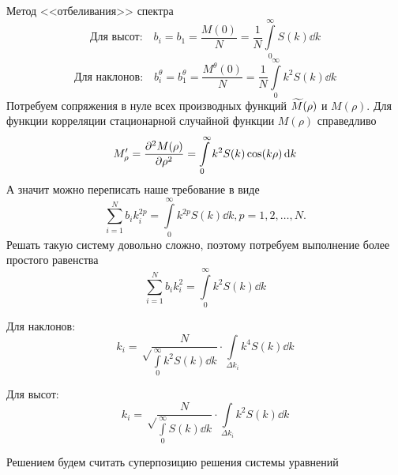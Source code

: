 \begin{frame}[t]{}
\begin{columns}[t]
\begin{column}{.48\linewidth}
\begin{block}{Метод <<отбеливания>> спектра}
           \begin{equation}
                \text{Для высот:}\quad 	b_i=b_1= \frac{M(0)}{N}=\frac1N \int\limits_0^{\infty} S(k) \dd{k}
           \end{equation}
           \begin{equation}
                \text{Для наклонов:}\quad 	b^{\theta}_i=b^{\theta}_1= \frac{M^{\theta}(0)}{N}=\frac1N \int\limits_0^{\infty} k^2S(k) \dd{k}
           \end{equation}
            Потребуем сопряжения в нуле всех производных  функций
            $\widetilde{M}(\rho)$ и $M(\rho)$. 
            Для функции корреляции стационарной случайной функции $M(\rho)$ справедливо
            \begin{equation}
                M'_{\rho}=\pdv[2]{M(\rho)}{\rho}=\int\limits_{0}^{\infty} k^2 S(k)\cos(k \rho)\dd{k}
            \end{equation}
            А значит можно переписать наше требование в виде
            \begin{equation}
                \sum_{i=1}^N b_i k_i^{2p}=\int\limits_{0}^{\infty} k^{2p}S(k)\dd{k}, p = 1,2,\dots,N.
            \end{equation}
            Решать такую систему довольно сложно, поэтому потребуем выполнение более простого равенства
            \begin{equation}
                \sum_{i=1}^N b_ik_i^{2}=\int\limits_{0}^{\infty} k^{2}S(k)\dd{k}
            \end{equation}
            \begin{minipage}{0.49\linewidth}
                \centering Для наклонов:
                \begin{equation}
                    k_i=\sqrt\frac{N}{{\int\limits_{0}^{\infty} k^2 S(k) \dd{k}}}\cdot {\int\limits_{\Delta k_i} k^4 S(k) \dd{k}}
                \end{equation}
                \end{minipage}
                \hfill
                \begin{minipage}{0.49\linewidth}
                \centering Для высот:
                \begin{equation}
                    k_i=\sqrt\frac{N}{{\int\limits_{0}^{\infty} S(k) \dd{k}}}\cdot \int\limits_{\Delta k_i} k^2 S(k) \dd{k}
                \end{equation}
                \end{minipage}
                \vfill
                Решением будем считать суперпозицию решения системы уравнений

\end{block}
\end{column}
\end{columns}
\end{frame}
